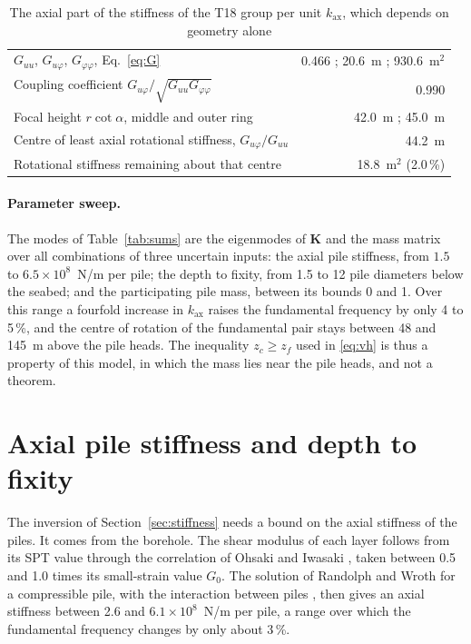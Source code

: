 \documentclass[11pt]{article}
\begin{document}
\begin{table}[htbp]
\centering
\caption{The axial part of the stiffness of the T18 group per unit $k_{\mathrm{ax}}$, which depends on geometry alone}
\label{tab:G}
\begin{tabularx}{\linewidth}{@{}Lr@{}}
\toprule
$G_{uu}$, $G_{u\varphi}$, $G_{\varphi\varphi}$, Eq.~\eqref{eq:G} & 0.466 ; 20.6~m ; 930.6~m$^2$ \\
Coupling coefficient $G_{u\varphi}/\sqrt{G_{uu}G_{\varphi\varphi}}$ & 0.990 \\
Focal height $r\cot\alpha$, middle and outer ring & 42.0~m ; 45.0~m \\
Centre of least axial rotational stiffness, $G_{u\varphi}/G_{uu}$ & 44.2~m \\
Rotational stiffness remaining about that centre & 18.8~m$^2$ (2.0\,\%) \\
\bottomrule
\end{tabularx}
\end{table}

\paragraph{Parameter sweep.} The modes of Table~\ref{tab:sums} are the eigenmodes of $\mathbf{K}$ and the mass matrix over all combinations of three uncertain inputs: the axial pile stiffness, from $1.5$ to $6.5\times10^{8}$~N/m per pile; the depth to fixity, from 1.5 to 12 pile diameters below the seabed; and the participating pile mass, between its bounds 0 and 1. Over this range a fourfold increase in $k_{\mathrm{ax}}$ raises the fundamental frequency by only 4 to 5\,\%, and the centre of rotation of the fundamental pair stays between 48 and 145~m above the pile heads. The inequality $z_c \geq z_f$ used in \eqref{eq:vh} is thus a property of this model, in which the mass lies near the pile heads, and not a theorem.

\section{Axial pile stiffness and depth to fixity}
\label{app:fixity}

The inversion of Section~\ref{sec:stiffness} needs a bound on the axial stiffness of the piles. It comes from the borehole. The shear modulus of each layer follows from its SPT value through the correlation of Ohsaki and Iwasaki \cite{ohsaki1973}, taken between 0.5 and 1.0 times its small-strain value $G_0$. The solution of Randolph and Wroth \cite{randolph1978} for a compressible pile, with the interaction between piles \cite{randolph1979}, then gives an axial stiffness between 2.6 and $6.1\times10^{8}$~N/m per pile, a range over which the fundamental frequency changes by only about 3\,\%.
\end{document}
